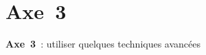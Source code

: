 \documentclass[10pt,xcolor={dvipsnames}]{beamer}
\begin{document}
\begin{frame} \frametitle{}
\part{Axe~3}
\begin{center} \Large
    {\bf Axe~3}~: utiliser quelques techniques avancées
\end{center}

\begin{footnotesize}
    \tableofcontents[hideallsubsections,part=3]
\end{footnotesize}
\end{frame}





\end{document}
